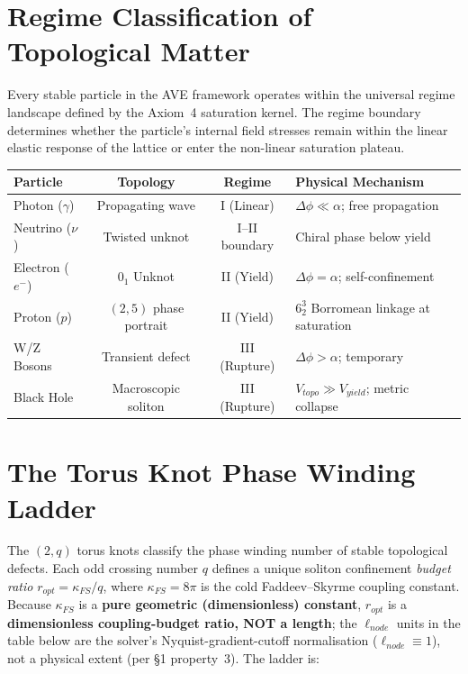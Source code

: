 \section{Regime Classification of Topological Matter}

Every stable particle in the AVE framework operates within the universal regime landscape defined by the Axiom~4 saturation kernel. The regime boundary determines whether the particle's internal field stresses remain within the linear elastic response of the lattice or enter the non-linear saturation plateau.

\begin{center}
\small
\renewcommand{\arraystretch}{1.2}
\begin{tabular}{lccl}
\toprule
\textbf{Particle} & \textbf{Topology} & \textbf{Regime} & \textbf{Physical Mechanism} \\
\midrule
Photon ($\gamma$)          & Propagating wave    & I (Linear)    & $\Delta\phi \ll \alpha$; free propagation \\
Neutrino ($\nu$)           & Twisted unknot      & I--II boundary & Chiral phase below yield \\
Electron ($e^-$)           & $0_1$ Unknot         & II (Yield)    & $\Delta\phi = \alpha$; self-confinement \\
Proton ($p$)               & $(2,5)$ phase portrait & II (Yield)    & $6^3_2$ Borromean linkage at saturation \\
W/Z Bosons                 & Transient defect     & III (Rupture)  & $\Delta\phi > \alpha$; temporary \\
Black Hole                 & Macroscopic soliton  & III (Rupture)  & $V_{topo} \gg V_{yield}$; metric collapse \\
\bottomrule
\end{tabular}
\end{center}

\section{The Torus Knot Phase Winding Ladder}

The $(2,q)$ torus knots classify the phase winding number of stable topological defects. Each odd crossing number $q$ defines a unique soliton confinement \emph{budget ratio} $r_{opt} = \kappa_{FS} / q$, where $\kappa_{FS} = 8\pi$ is the cold Faddeev--Skyrme coupling constant. Because $\kappa_{FS}$ is a \textbf{pure geometric (dimensionless) constant}, $r_{opt}$ is a \textbf{dimensionless coupling-budget ratio, NOT a length}; the $\ell_{node}$ units in the table below are the solver's Nyquist-gradient-cutoff normalisation ($\ell_{node} \equiv 1$), not a physical extent (per  \S1 property~3). The ladder is:

